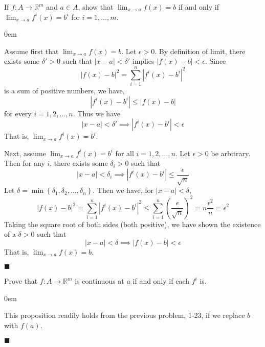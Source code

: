 \documentclass[12pt]{article}
\renewcommand{\qed}{\hfill$\blacksquare$}
\renewenvironment{proof}{\begin{addmargin}[1em]{0em}\begin{newproof}}{\end{newproof}\end{addmargin}\qed}
\newenvironment{problem}[2][Problem]{\begin{trivlist}
\item[\hskip \labelsep {\bfseries #1}\hskip \labelsep {\bfseries #2.}]}{\end{trivlist}}
\begin{document}
 
 
 
\begin{problem}{1.23}
If $f:A\rightarrow \mathbb{R}^m$ and $a\in A$, show that $\lim_{x\rightarrow a} f\left(x\right) = b$ if and only if $\lim_{x\rightarrow a} f^i\left(x\right) = b^i$ for $i=1,\ldots,m $.
\end{problem}
 
\begin{proof}
Assume first that $\lim_{x\rightarrow a} f\left(x\right) = b$.  Let $\epsilon > 0$. By definition of limit, there exists some $\delta' > 0$ such that $\left|x-a\right| < \delta '$ implies $\left|f\left(x\right) - b\right| < \epsilon $. Since 
$$ \left|f\left(x\right)-b\right|^2 = \sum_{i=1}^n \left| f^i\left(x\right) - b^i \right|^2 $$ is a sum of positive numbers, we have, 
$$ \left|f^i \left(x\right) -b^i \right| \leq \left|f\left(x\right)-b\right| $$ for every $i =1,2,\ldots,n$. Thus we have
$$ \left|x-a\right|< \delta ' \implies \left|f^i \left(x\right)-b^i\right| < \epsilon $$
That is, $\lim_{x\rightarrow a} f^i\left(x\right) = b^i $.

Next, assume $\lim_{x\rightarrow a} f^i\left(x\right)=b^i$ for all $i=1,2,\ldots,n$. Let $\epsilon >0$ be arbitrary. Then for any $i$, there exists some $\delta_i > 0$ such that $$ \left|x-a\right| < \delta_i \implies \left|f^i\left(x\right)-b^i\right| \leq \frac{\epsilon}{\sqrt{n}} $$ Let $\delta = \min\left\{\delta_1,\delta_2,\ldots,\delta_n\right\}$. Then we have, for $\left|x-a\right|<\delta$, 
$$ \left|f\left(x\right)-b\right|^2 = \sum_{i=1}^n \left|f^i\left(x\right)-b^i\right|^2 \leq \sum_{i=1}^n \left(\frac{\epsilon}{\sqrt{n}}\right)^2 = n \frac{\epsilon^2}{n} = \epsilon^2 $$ Taking the square root of both sides (both positive), we have shown the existence of a $\delta >0$ such that
$$ \left|x-a\right|< \delta \implies \left|f\left(x\right)-b\right| < \epsilon $$
That is, $\lim_{x\rightarrow a} f\left(x\right) = b$.

\end{proof}
 
 
 
\begin{problem}{1.24}
Prove that $f:A\rightarrow \mathbb{R}^m$ is continuous at $a$ if and only if each $f^i$ is.
\end{problem} 
 
 \begin{proof}
 This proposition readily holds from the previous problem, 1-23, if we replace $b$ with $f\left(a\right)$.
 \end{proof}
\end{document}
